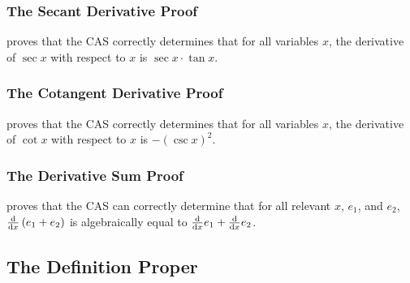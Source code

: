 \documentclass{report}
\begin{document}
\subsubsection{The Secant Derivative Proof}
  proves that the  CAS correctly determines that for all variables \(x\), the derivative of \(\sec x\) with respect to \(x\) is \(\sec x \cdot \tan x\).

\subsubsection{The Cotangent Derivative Proof}
  proves that the  CAS correctly determines that for all variables \(x\), the derivative of \(\cot x\) with respect to \(x\) is \(- \left(\csc x\right)^2\).

\subsubsection{The Derivative Sum Proof}
  proves that the  CAS can correctly determine that for all relevant \(x\), \(e_1\), and \(e_2\), \(\derivative{x} \left(e_1 + e_2\right)\) is algebraically equal to \(\derivative{x} e_1 + \derivative{x} e_2\).

\subsection{The Definition Proper}
\end{document}
